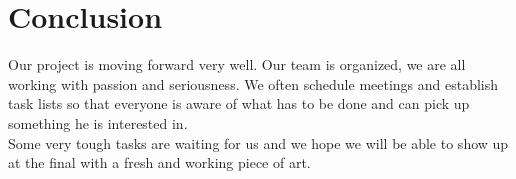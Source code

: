 \documentclass[12pt]{report}
\begin{document}









 


\chapter*{Conclusion}

Our project is moving forward very well. Our team is organized, we are all
working with passion and seriousness. We often schedule meetings and establish
task lists so that everyone is aware of what has to be done and can pick up
something he is interested in. \\

Some very tough tasks are waiting for us and we hope we will be able to show up
at the final with a fresh and working piece of art.
\end{document}
